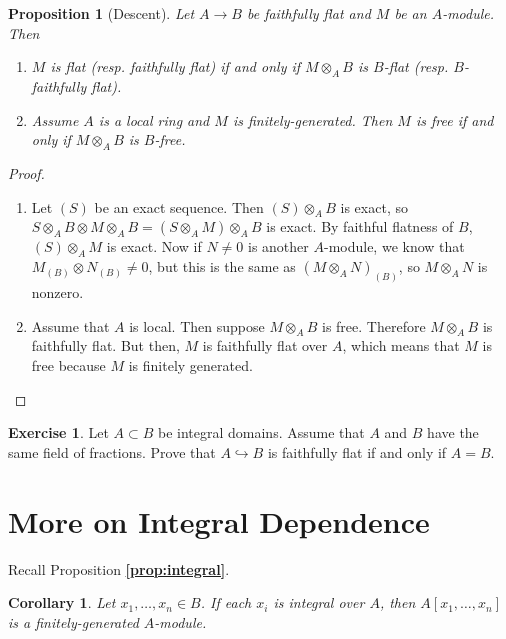 \documentclass[leqno, openany]{memoir}
\newtheorem{cor}[thm]{Corollary}
\newtheorem{prop}[thm]{Proposition}
\theoremstyle{definition}
\newtheorem{exer}[thm]{Exercise}
\theoremstyle{remark}
\theoremstyle{plain}
\theoremstyle{definition}
\theoremstyle{remark}
\begin{document}
\begin{prop}[Descent] Let $A \to B$ be faithfully flat and $M$ be an
    $A$-module. Then \begin{enumerate} \item $M$ is flat (resp. faithfully
        flat) if and only if $M \otimes_A B$ is $B$-flat (resp. $B$-faithfully
        flat).  \item Assume $A$ is a local ring and $M$ is finitely-generated.
        Then $M$ is free if and only if $M \otimes_A B$ is $B$-free.
\end{enumerate} \end{prop}

\begin{proof} \begin{enumerate} \item Let $(S)$ be an exact sequence. Then $(S)
    \otimes_A B$ is exact, so $S \otimes_A B \otimes M \otimes_A B = (S
    \otimes_A M) \otimes_A B$ is exact. By faithful flatness of $B$, $(S)
    \otimes_A M$ is exact. Now if $N \neq 0$ is another $A$-module, we know
    that $M_{(B)} \otimes N_{(B)} \neq 0$, but this is the same as $(M
    \otimes_A N)_{(B)}$, so $M \otimes_A N$ is nonzero.  \item Assume that $A$
    is local. Then suppose $M \otimes_A B$ is free. Therefore $M \otimes_A B$
    is faithfully flat. But then, $M$ is faithfully flat over $A$, which means
    that $M$ is free because $M$ is finitely generated. \qedhere
    \end{enumerate} \end{proof}

\begin{exer} Let $A \subset B$ be integral domains. Assume that $A$ and $B$
have the same field of fractions. Prove that $A \hookrightarrow B$ is
faithfully flat if and only if $A = B$.  \end{exer}

\section{More on Integral Dependence}%

Recall Proposition \textbf{\ref{prop:integral}}. 

\begin{cor} Let $x_1, \ldots, x_n \in B$. If each $x_i$ is integral over $A$,
then $A[x_1, \ldots, x_n]$ is a finitely-generated $A$-module.  \end{cor}
\end{document}
